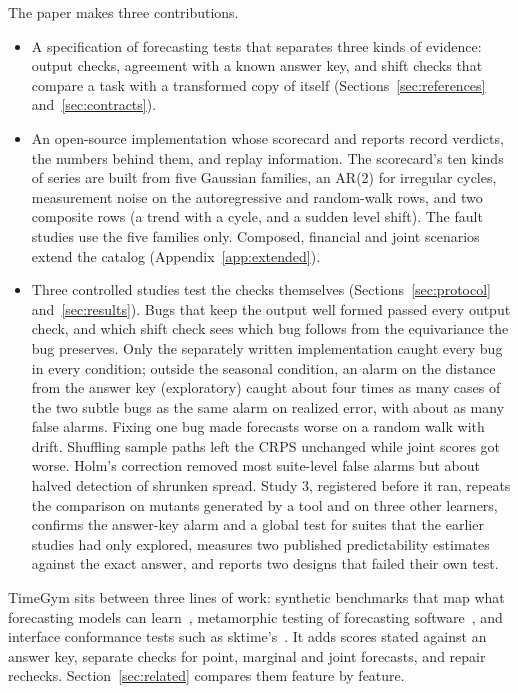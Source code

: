 \documentclass[11pt,a4paper]{article}
\begin{document}
The paper makes three contributions.
\begin{itemize}
\item A specification of forecasting tests that separates three kinds of
evidence: output checks, agreement with a known answer key, and shift
checks that compare a task with a transformed copy of itself
(Sections~\ref{sec:references} and~\ref{sec:contracts}).
\item An open-source implementation whose scorecard and reports record
verdicts, the numbers behind them, and replay information. The
scorecard's ten kinds of series are built from five Gaussian families, an
AR(2) for irregular cycles, measurement noise on the autoregressive and
random-walk rows, and two composite rows (a trend with a cycle, and a
sudden level shift). The fault studies use the five families only. Composed,
financial and joint scenarios extend the catalog
(Appendix~\ref{app:extended}).
\item Three controlled studies test the checks themselves
(Sections~\ref{sec:protocol} and~\ref{sec:results}). Bugs that keep the
output well formed passed every output check, and which shift check sees
which bug follows from the equivariance the bug preserves. Only the
separately written implementation caught every bug in every condition;
outside the seasonal condition, an alarm on the distance from the answer
key (exploratory) caught about four times as many cases of the two subtle
bugs as the same alarm on realized error, with about as many false alarms.
Fixing one bug made forecasts worse on a random walk with drift.
Shuffling sample paths left the CRPS unchanged while joint scores got
worse. Holm's correction removed most suite-level false alarms but about
halved detection of shrunken spread. Study 3, registered before it ran,
repeats the comparison on mutants generated by a tool and on three other
learners, confirms the answer-key alarm and a global test for suites that
the earlier studies had only explored, measures two published
predictability estimates against the exact answer, and reports two
designs that failed their own test.
\end{itemize}

TimeGym sits between three lines of work: synthetic benchmarks that map
what forecasting models can
learn~\cite{tan2025syntsbench,ghoroghchian2026simpletimebench,sun2026finstressts},
metamorphic testing of forecasting
software~\cite{dwarakanath2019metamorphic}, and interface conformance
tests such as sktime's~\cite{sktimeConformance}. It adds scores stated
against an answer key, separate checks for point, marginal and joint
forecasts, and repair rechecks. Section~\ref{sec:related} compares them
feature by feature.
\end{document}
